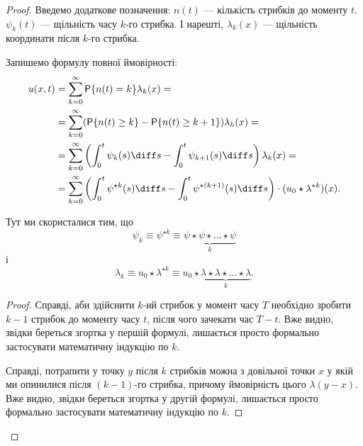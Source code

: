 \begin{proof}
    Введемо додаткове позначення: $n(t)$ --- кількість стрибків до моменту $t$. $\psi_k(t)$ --- щільність часу $k$-го стрибка. І нарешті, $\lambda_k(x)$ --- щільність координати після $k$-го стрибка. \medskip

    Запишемо формулу повної ймовірності:
    \begin{equation}
        \begin{aligned}
            u(x, t)
            &= \sum_{k = 0}^\infty \mathsf{P}\{n(t) = k\} \lambda_k (x) = \\
            &= \sum_{k = 0}^\infty (\mathsf{P}\{n(t) \ge k\} - \mathsf{P}\{n(t) \ge k + 1\}) \lambda_k (x) = \\
            &= \sum_{k = 0}^\infty \left( \int_0^t \psi_k(s) \diff s - \int_0^t \psi_{k + 1} (s) \diff s \right) \lambda_k (x) = \\
            &= \sum_{k = 0}^\infty \left( \int_0^t \psi^{\star k}(s) \diff s - \int_0^t \psi^{\star(k + 1)} (s) \diff s \right) \cdot (u_0 \star \lambda^{\star k}) (x).
        \end{aligned}
    \end{equation}

    \begin{remark}
        Тут ми скористалися тим, що 
        \begin{equation}
            \psi_k \equiv \psi^{\star k} \equiv \underset{k}{\underbrace{\psi \star \psi \star \ldots \star \psi}}
        \end{equation}
        і
        \begin{equation}
            \lambda_k \equiv u_0 \star \lambda^{\star k} \equiv u_0 \star \underset{k}{\underbrace{\lambda \star \lambda \star \ldots \star \lambda}}.
        \end{equation}
    \end{remark}
    
    \begin{proof}
        Справді, аби здійснити $k$-ий стрибок у момент часу $T$ необхідно зробити $k-1$ стрибок до моменту часу $t$, після чого зачекати час $T - t$. Вже видно, звідки береться згортка у першій формулі, лишається просто формально застосувати математичну індукцію по $k$. \medskip
    
        Справді, потрапити у точку $y$ після $k$ стрибків можна з довільної точки $x$ у якій ми опинилися після $(k - 1)$-го стрибка, причому ймовірність цього $\lambda (y - x)$. Вже видно, звідки береться згортка у другій формулі, лишається просто формально застосувати математичну індукцію по $k$.
    \end{proof}


\end{proof}
